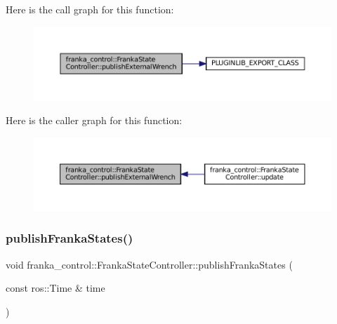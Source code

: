 Here is the call graph for this function\+:
\nopagebreak
\begin{figure}[H]
\begin{center}
\leavevmode
\includegraphics[width=350pt]{classfranka__control_1_1FrankaStateController_a16421a8f95eb59bb9e94e4f011e33cb2_cgraph}
\end{center}
\end{figure}
Here is the caller graph for this function\+:
\nopagebreak
\begin{figure}[H]
\begin{center}
\leavevmode
\includegraphics[width=350pt]{classfranka__control_1_1FrankaStateController_a16421a8f95eb59bb9e94e4f011e33cb2_icgraph}
\end{center}
\end{figure}
\mbox{\label{classfranka__control_1_1FrankaStateController_a70977857f43faff9127db1ebfeddc1b5}} 
\subsubsection{\texorpdfstring{publish\+Franka\+States()}{publishFrankaStates()}}
{\footnotesize\ttfamily void franka\+\_\+control\+::\+Franka\+State\+Controller\+::publish\+Franka\+States (\begin{DoxyParamCaption}\item[{const ros\+::\+Time \&}]{time }\end{DoxyParamCaption})\hspace{0.3cm}{\ttfamily [private]}}



